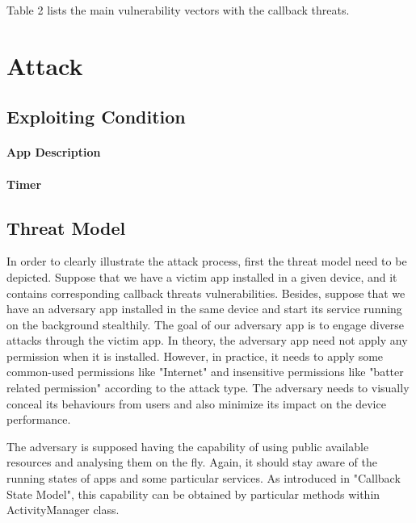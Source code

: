 \documentclass{sig-alternate-05-2015}
\begin{document}
{\color{red}Table 2} lists the main vulnerability vectors with the callback threats. 

\section{Attack}

\subsection{Exploiting Condition}
\paragraph{App Description}
\paragraph{Timer}

\subsection{Threat Model}
In order to clearly illustrate the attack process, first the threat model need to be depicted.
Suppose that we have a victim app installed in a given device, and it contains corresponding callback threats vulnerabilities. Besides, suppose that we have an adversary app installed in the same device and start its service running on the background stealthily. The goal of our adversary app is to engage diverse attacks through the victim app. In theory, the adversary app need not apply any permission when it is installed. However, in practice, it needs to apply some  common-used permissions like "Internet" and insensitive permissions like "batter related permission" according to the attack type. The adversary needs to visually conceal its behaviours from users and also minimize its impact on the device performance. 

The adversary is supposed having the capability of using public available resources and analysing them on the fly. Again, it should stay aware of the running states of apps and some particular services. As introduced in "Callback State Model", this capability can be obtained by particular methods within ActivityManager class.
\end{document}

